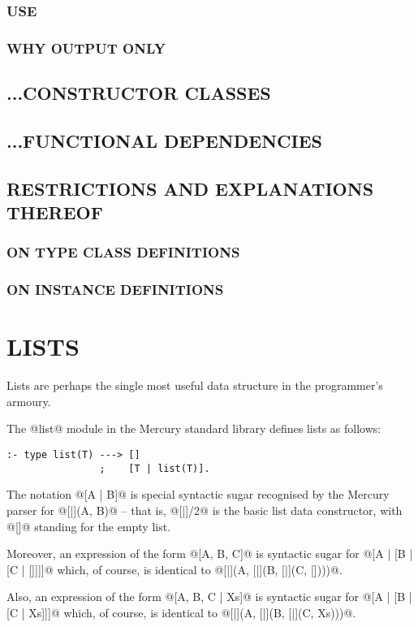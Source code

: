 \documentclass[a4paper,11pt,notitlepage,onecolumn]{article}
\begin{document}
\subsubsection{USE}
\subsubsection{WHY OUTPUT ONLY}
\subsection{...CONSTRUCTOR CLASSES}
\subsection{...FUNCTIONAL DEPENDENCIES}
\subsection{RESTRICTIONS AND EXPLANATIONS THEREOF}
\subsubsection{ON TYPE CLASS DEFINITIONS}
\subsubsection{ON INSTANCE DEFINITIONS}



\section{LISTS}

Lists are perhaps the single most useful data structure in the
programmer's armoury.

The @list@ module in the Mercury standard library defines lists as
follows:
\begin{verbatim}
:- type list(T) ---> []
                ;    [T | list(T)].
\end{verbatim}
The notation @[A | B]@ is special syntactic sugar recognised by the
Mercury parser for @[|](A, B)@ -- that is, @[|]/2@ is the basic list
data constructor, with @[]@ standing for the empty list.

Moreover, an expression of the form @[A, B, C]@ is syntactic sugar for
@[A | [B | [C | []]]]@ which, of course, is identical to
@[|](A, [|](B, [|](C, [])))@.

Also, an expression of the form @[A, B, C | Xs]@ is syntactic sugar for
@[A | [B | [C | Xs]]]@ which, of course, is identical to
@[|](A, [|](B, [|](C, Xs)))@.
\end{document}
